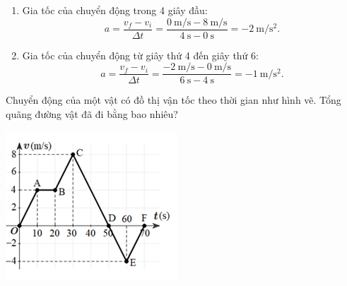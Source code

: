 \begin{ex}
{\begin{enumerate}[label=\alph*)]
\begin{itemize}
				Độ dịch chuyển bằng diện tích tam giác vuông có cạnh đáy là $t$ và chiều cao là $v$.
				$$d_2 = \dfrac{1}{2} \cdot \left(-\SI{2}{\meter/\second}\right) \cdot \SI{2}{\second} = -\SI{2}{\meter}.$$
				\item Trong 3 giây cuối (từ giây thứ 6 đến giây thứ 9):
				Độ dịch chuyển bằng diện tích hình chữ nhật có chiều dài là $t$ và chiều rộng là $v$.
				$$d_3 = \left(-\SI{2}{\meter/\second}\right) \cdot \SI{3}{\second} = -\SI{6}{\meter}.$$
			\end{itemize}
			\item Gia tốc của chuyển động trong 4 giây đầu:
			$$a = \dfrac{v_f - v_i}{\Delta t} =\dfrac{\SI{0}{\meter/\second} - \SI{8}{\meter/\second}}{\SI{4}{\second}-\SI{0}{\second}}= -\SI{2}{\meter/\second^2}.$$
			\item Gia tốc của chuyển động từ giây thứ 4 đến giây thứ 6:
			$$a = \dfrac{v_f - v_i}{\Delta t} =\dfrac{-\SI{2}{\meter/\second} - \SI{0}{\meter/\second}}{\SI{6}{\second}-\SI{4}{\second}}= -\SI{1}{\meter/\second^2}.$$
		\end{enumerate}
	}
\end{ex}

\begin{ex}
	Chuyển động của một vật có đồ thị vận tốc theo thời gian như hình vẽ. Tổng quãng đường vật đã đi bằng bao nhiêu?
	\begin{center}
		\includegraphics[scale=0.5]{figs/G10Y25B6-25}
	\end{center}
\end{ex}

